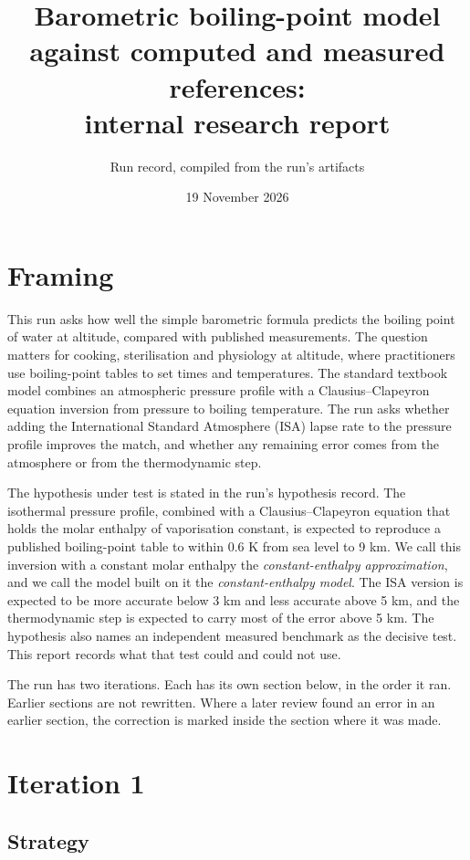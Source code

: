 \documentclass[11pt,letterpaper]{article}
\title{Barometric boiling-point model against computed and measured references:\\internal research report}
\author{Run record, compiled from the run's artifacts}
\date{19 November 2026}
\begin{document}
\maketitle
\tableofcontents

\section{Framing}

This run asks how well the simple barometric formula predicts the boiling point of water at altitude, compared with published measurements. The question matters for cooking, sterilisation and physiology at altitude, where practitioners use boiling-point tables to set times and temperatures. The standard textbook model combines an atmospheric pressure profile with a Clausius--Clapeyron equation inversion from pressure to boiling temperature. The run asks whether adding the International Standard Atmosphere (ISA) lapse rate to the pressure profile improves the match, and whether any remaining error comes from the atmosphere or from the thermodynamic step.

The hypothesis under test is stated in the run's hypothesis record. The isothermal pressure profile, combined with a Clausius--Clapeyron equation that holds the molar enthalpy of vaporisation constant, is expected to reproduce a published boiling-point table to within 0.6 K from sea level to 9 km. We call this inversion with a constant molar enthalpy the \emph{constant-enthalpy approximation}, and we call the model built on it the \emph{constant-enthalpy model}. The ISA version is expected to be more accurate below 3 km and less accurate above 5 km, and the thermodynamic step is expected to carry most of the error above 5 km. The hypothesis also names an independent measured benchmark as the decisive test. This report records what that test could and could not use.

The run has two iterations. Each has its own section below, in the order it ran. Earlier sections are not rewritten. Where a later review found an error in an earlier section, the correction is marked inside the section where it was made.

\section{Iteration 1}\label{sec:it1}

\subsection{Strategy}
\end{document}
